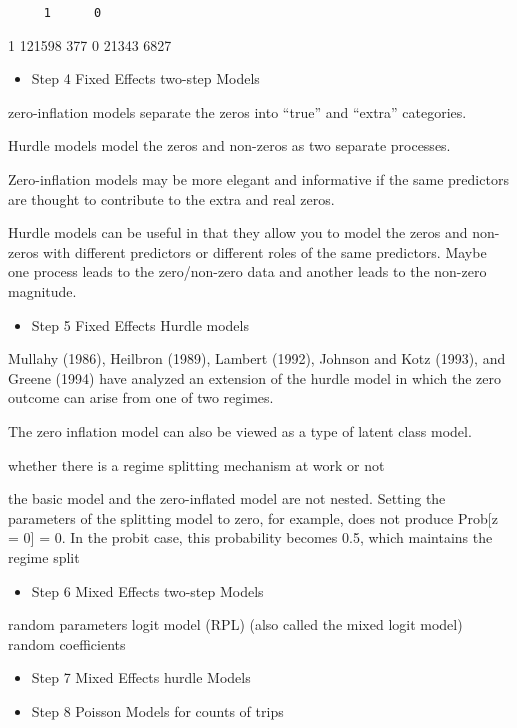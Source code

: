 \documentclass[numbered]{trbunofficial}
\providecommand{\tightlist}{%
  \setlength{\itemsep}{0pt}\setlength{\parskip}{0pt}}
\begin{document}
\begin{verbatim}
     1      0
\end{verbatim}

1 121598 377
0 21343 6827

\begin{itemize}
\tightlist
\item
  Step 4 Fixed Effects two-step Models
\end{itemize}

zero-inflation models separate the zeros into ``true'' and ``extra'' categories.

Hurdle models model the zeros and non-zeros as two separate processes.

Zero-inflation models may be more elegant and informative if the same predictors are thought to contribute to the extra and real zeros.

Hurdle models can be useful in that they allow you to model the zeros and non-zeros with different predictors or different roles of the same predictors. Maybe one process leads to the zero/non-zero data and another leads to the non-zero magnitude.

\begin{itemize}
\tightlist
\item
  Step 5 Fixed Effects Hurdle models
\end{itemize}

Mullahy (1986), Heilbron (1989), Lambert (1992), Johnson and Kotz (1993), and Greene (1994) have analyzed an extension of the hurdle model in which the zero outcome can arise from one of two regimes.

The zero inflation model can also be viewed as a type of latent class model.

whether there is a regime splitting mechanism at work or not

the basic model and the zero-inflated model are not nested.
Setting the parameters of the splitting model to zero, for example, does not produce Prob{[}z = 0{]} = 0. In the probit case, this probability becomes 0.5, which maintains the regime split

\begin{itemize}
\tightlist
\item
  Step 6 Mixed Effects two-step Models
\end{itemize}

random parameters logit model (RPL) (also called the mixed logit model)
random coefficients

\begin{itemize}
\item
  Step 7 Mixed Effects hurdle Models
\item
  Step 8 Poisson Models for counts of trips
\end{itemize}
\end{document}
